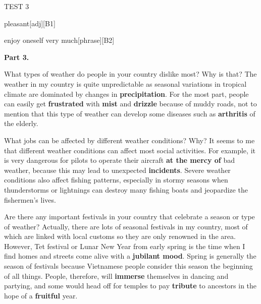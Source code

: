 \begin{glossarymc}[Cambridge 11]
\begin{test}{TEST 3}
\begin{VocabExplain}[Part 2]
            \begin{ExplainCard}{pleasant}[adj][B1]
            \end{ExplainCard}

            \begin{ExplainCard}{enjoy oneself very much}[phrase][B2]
            \end{ExplainCard}
        \end{VocabExplain}

    \noindent
    \textbf{Part 3.}
    \begin{qa}{What types of weather do people in your country dislike most? Why is that?}
    The weather in my country is quite unpredictable as seasonal variations in tropical climate are dominated by changes in \textbf{precipitation}. For the most part, people can easily get \textbf{frustrated} with \textbf{mist} and \textbf{drizzle} because of muddy roads, not to mention that this type of weather can develop some diseases such as \textbf{arthritis} of the elderly.
    \end{qa}

    \begin{qa}{What jobs can be affected by different weather conditions? Why?}
    It seems to me that different weather conditions can affect most social activities. For example, it is very dangerous for pilots to operate their aircraft \textbf{at the mercy of} bad weather, because this may lead to unexpected \textbf{incidents}. Severe weather conditions also affect fishing patterns, especially in stormy seasons when thunderstorms or lightnings can destroy many fishing boats and jeopardize the fishermen’s lives.
    \end{qa}

    \begin{qa}{Are there any important festivals in your country that celebrate a season or type of weather?}
    Actually, there are lots of seasonal festivals in my country, most of which are linked with local customs so they are only renowned in the area. However, Tet festival or Lunar New Year from early spring is the time when I find homes and streets come alive with a \textbf{jubilant mood}. Spring is generally the season of festivals because Vietnamese people consider this season the beginning of all things. People, therefore, will \textbf{immerse} themselves in dancing and partying, and some would head off for temples to pay \textbf{tribute} to ancestors in the hope of a \textbf{fruitful} year.
    \end{qa}


\end{test}
\end{glossarymc}
